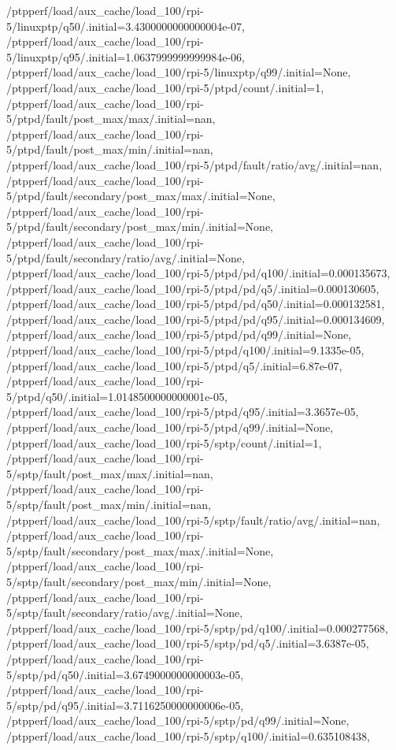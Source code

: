 {    /ptpperf/load/aux_cache/load_100/rpi-5/linuxptp/q50/.initial=3.4300000000000004e-07,
    /ptpperf/load/aux_cache/load_100/rpi-5/linuxptp/q95/.initial=1.0637999999999984e-06,
    /ptpperf/load/aux_cache/load_100/rpi-5/linuxptp/q99/.initial=None,
    /ptpperf/load/aux_cache/load_100/rpi-5/ptpd/count/.initial=1,
    /ptpperf/load/aux_cache/load_100/rpi-5/ptpd/fault/post_max/max/.initial=nan,
    /ptpperf/load/aux_cache/load_100/rpi-5/ptpd/fault/post_max/min/.initial=nan,
    /ptpperf/load/aux_cache/load_100/rpi-5/ptpd/fault/ratio/avg/.initial=nan,
    /ptpperf/load/aux_cache/load_100/rpi-5/ptpd/fault/secondary/post_max/max/.initial=None,
    /ptpperf/load/aux_cache/load_100/rpi-5/ptpd/fault/secondary/post_max/min/.initial=None,
    /ptpperf/load/aux_cache/load_100/rpi-5/ptpd/fault/secondary/ratio/avg/.initial=None,
    /ptpperf/load/aux_cache/load_100/rpi-5/ptpd/pd/q100/.initial=0.000135673,
    /ptpperf/load/aux_cache/load_100/rpi-5/ptpd/pd/q5/.initial=0.000130605,
    /ptpperf/load/aux_cache/load_100/rpi-5/ptpd/pd/q50/.initial=0.000132581,
    /ptpperf/load/aux_cache/load_100/rpi-5/ptpd/pd/q95/.initial=0.000134609,
    /ptpperf/load/aux_cache/load_100/rpi-5/ptpd/pd/q99/.initial=None,
    /ptpperf/load/aux_cache/load_100/rpi-5/ptpd/q100/.initial=9.1335e-05,
    /ptpperf/load/aux_cache/load_100/rpi-5/ptpd/q5/.initial=6.87e-07,
    /ptpperf/load/aux_cache/load_100/rpi-5/ptpd/q50/.initial=1.0148500000000001e-05,
    /ptpperf/load/aux_cache/load_100/rpi-5/ptpd/q95/.initial=3.3657e-05,
    /ptpperf/load/aux_cache/load_100/rpi-5/ptpd/q99/.initial=None,
    /ptpperf/load/aux_cache/load_100/rpi-5/sptp/count/.initial=1,
    /ptpperf/load/aux_cache/load_100/rpi-5/sptp/fault/post_max/max/.initial=nan,
    /ptpperf/load/aux_cache/load_100/rpi-5/sptp/fault/post_max/min/.initial=nan,
    /ptpperf/load/aux_cache/load_100/rpi-5/sptp/fault/ratio/avg/.initial=nan,
    /ptpperf/load/aux_cache/load_100/rpi-5/sptp/fault/secondary/post_max/max/.initial=None,
    /ptpperf/load/aux_cache/load_100/rpi-5/sptp/fault/secondary/post_max/min/.initial=None,
    /ptpperf/load/aux_cache/load_100/rpi-5/sptp/fault/secondary/ratio/avg/.initial=None,
    /ptpperf/load/aux_cache/load_100/rpi-5/sptp/pd/q100/.initial=0.000277568,
    /ptpperf/load/aux_cache/load_100/rpi-5/sptp/pd/q5/.initial=3.6387e-05,
    /ptpperf/load/aux_cache/load_100/rpi-5/sptp/pd/q50/.initial=3.6749000000000003e-05,
    /ptpperf/load/aux_cache/load_100/rpi-5/sptp/pd/q95/.initial=3.7116250000000006e-05,
    /ptpperf/load/aux_cache/load_100/rpi-5/sptp/pd/q99/.initial=None,
    /ptpperf/load/aux_cache/load_100/rpi-5/sptp/q100/.initial=0.635108438,
}
